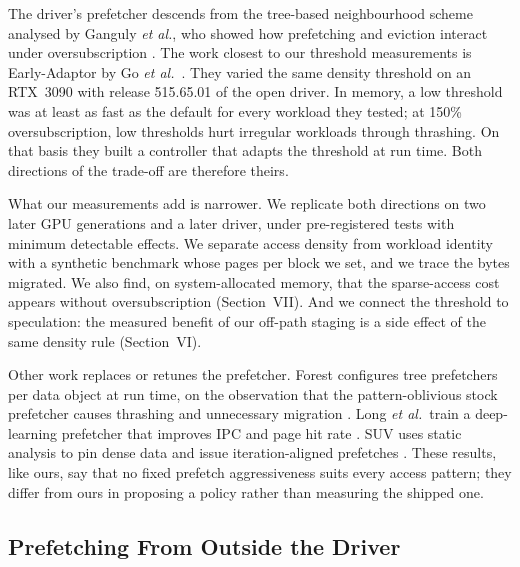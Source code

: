 The driver's prefetcher descends from the tree-based neighbourhood scheme
analysed by Ganguly \emph{et al.}, who showed how prefetching and eviction
interact under oversubscription \cite{ganguly2019interplay}. The work closest to
our threshold measurements is Early-Adaptor by Go \emph{et al.}\
\cite{go2023earlyadaptor}. They varied the same density threshold on an
RTX~3090 with release 515.65.01 of the open driver. In memory, a low threshold
was at least as fast as the default for every workload they tested; at 150\%
oversubscription, low thresholds hurt irregular workloads through thrashing.
On that basis they built a controller that adapts the threshold at run time.
Both directions of the trade-off are therefore theirs.

What our measurements add is narrower. We replicate both directions on two
later GPU generations and a later driver, under pre-registered tests with
minimum detectable effects. We separate access density from workload identity
with a synthetic benchmark whose pages per block we set, and we trace the bytes
migrated. We also find, on system-allocated memory, that the sparse-access cost
appears without oversubscription (Section~VII). And we connect the threshold to
speculation: the measured benefit of our off-path staging is a side effect of
the same density rule (Section~VI).

Other work replaces or retunes the prefetcher. Forest configures tree
prefetchers per data object at run time, on the observation that the
pattern-oblivious stock prefetcher causes thrashing and unnecessary migration
\cite{lin2025forest}. Long \emph{et al.}\ train a deep-learning prefetcher that
improves IPC and page hit rate \cite{long2022dlprefetch}. SUV uses static
analysis to pin dense data and issue iteration-aligned prefetches
\cite{pratheek2024suv}. These results, like ours, say that no fixed prefetch
aggressiveness suits every access pattern; they differ from ours in proposing a
policy rather than measuring the shipped one.

\subsection{Prefetching From Outside the Driver}


